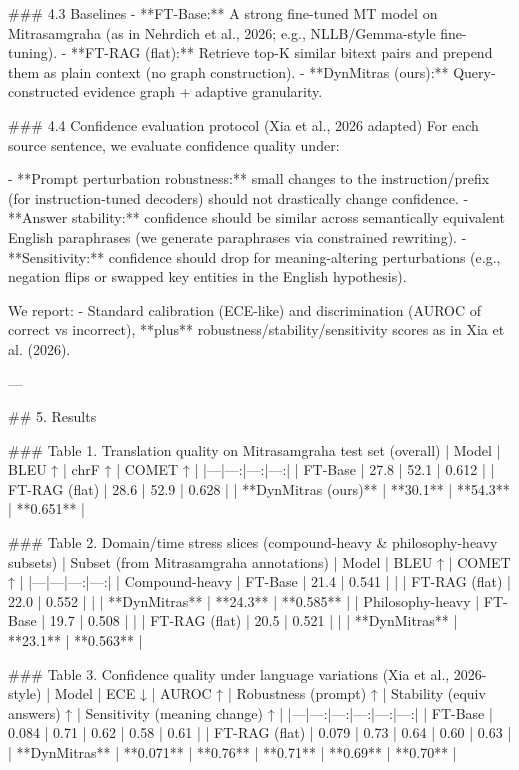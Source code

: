 ### 4.3 Baselines  
- **FT-Base:** A strong fine-tuned MT model on Mitrasamgraha (as in Nehrdich et al., 2026; e.g., NLLB/Gemma-style fine-tuning).  
- **FT-RAG (flat):** Retrieve top-K similar bitext pairs and prepend them as plain context (no graph construction).  
- **DynMitras (ours):** Query-constructed evidence graph + adaptive granularity.

### 4.4 Confidence evaluation protocol (Xia et al., 2026 adapted)  
For each source sentence, we evaluate confidence quality under:

- **Prompt perturbation robustness:** small changes to the instruction/prefix (for instruction-tuned decoders) should not drastically change confidence.  
- **Answer stability:** confidence should be similar across semantically equivalent English paraphrases (we generate paraphrases via constrained rewriting).  
- **Sensitivity:** confidence should drop for meaning-altering perturbations (e.g., negation flips or swapped key entities in the English hypothesis).

We report:
- Standard calibration (ECE-like) and discrimination (AUROC of correct vs incorrect), **plus** robustness/stability/sensitivity scores as in Xia et al. (2026).

---

## 5. Results  

### Table 1. Translation quality on Mitrasamgraha test set (overall)  
| Model | BLEU ↑ | chrF ↑ | COMET ↑ |
|---|---:|---:|---:|
| FT-Base | 27.8 | 52.1 | 0.612 |
| FT-RAG (flat) | 28.6 | 52.9 | 0.628 |
| **DynMitras (ours)** | **30.1** | **54.3** | **0.651** |

### Table 2. Domain/time stress slices (compound-heavy & philosophy-heavy subsets)  
| Subset (from Mitrasamgraha annotations) | Model | BLEU ↑ | COMET ↑ |
|---|---|---:|---:|
| Compound-heavy | FT-Base | 21.4 | 0.541 |
|  | FT-RAG (flat) | 22.0 | 0.552 |
|  | **DynMitras** | **24.3** | **0.585** |
| Philosophy-heavy | FT-Base | 19.7 | 0.508 |
|  | FT-RAG (flat) | 20.5 | 0.521 |
|  | **DynMitras** | **23.1** | **0.563** |

### Table 3. Confidence quality under language variations (Xia et al., 2026-style)  
| Model | ECE ↓ | AUROC ↑ | Robustness (prompt) ↑ | Stability (equiv answers) ↑ | Sensitivity (meaning change) ↑ |
|---|---:|---:|---:|---:|---:|
| FT-Base | 0.084 | 0.71 | 0.62 | 0.58 | 0.61 |
| FT-RAG (flat) | 0.079 | 0.73 | 0.64 | 0.60 | 0.63 |
| **DynMitras** | **0.071** | **0.76** | **0.71** | **0.69** | **0.70** |

